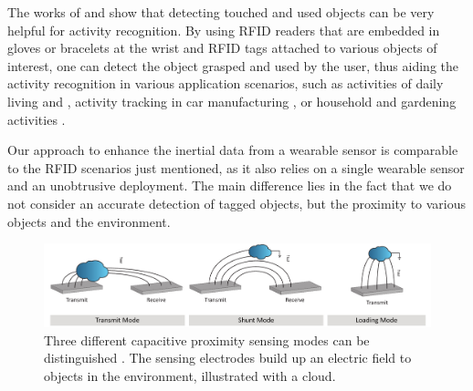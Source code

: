 \documentclass[runningheads,a4paper]{llncs}
\begin{document}
The works of \cite{Fishkin_2005} and \cite{patterson2005fga} show that detecting touched and used objects can be very helpful for activity recognition. By using RFID readers that are embedded in gloves or bracelets at the wrist and RFID tags attached to various objects of interest, one can detect the object grasped and used by the user, thus aiding the activity recognition in various application scenarios, such as activities of daily living \cite{phealth:maja} and \cite{Philipose_2004}, activity tracking in car manufacturing \cite{Stiefmeier08}, or household and gardening activities \cite{berlin_laerhoven_tei_2010}. 

Our approach to enhance the inertial data from a wearable sensor is comparable to the RFID scenarios just mentioned, as it also relies on a single wearable sensor and an unobtrusive deployment. The main difference lies in the fact that we do not consider an accurate detection of tagged objects, but the proximity to various objects and the environment. 




\begin{figure}
	\centering
		\includegraphics[width=1.00\textwidth]{Images/modes.pdf}
	\caption{Three different capacitive proximity sensing modes can be distinguished \cite{Smith1996}. The sensing electrodes build up an electric field to objects in the environment, illustrated with a cloud.}
	\label{fig:modes}
\end{figure}
\end{document}
